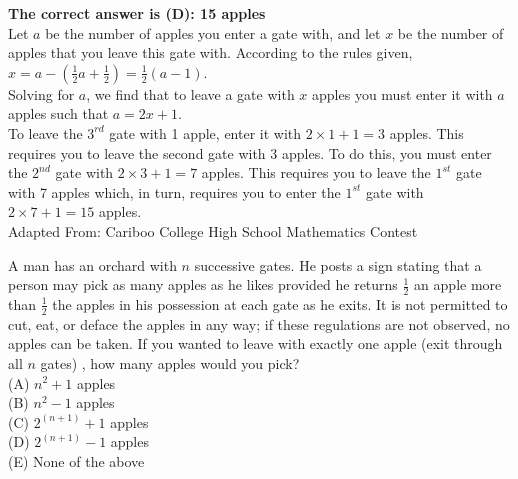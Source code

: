 \documentclass{article}
\begin{document}
\textbf{The correct answer is (D): 15 apples}\\[1 ex]
Let $a$ be the number of apples you enter a gate with, and let $x$ be the number of apples that you leave this gate with. According to the rules given, $x=a-(\frac{1}{2}a+\frac{1}{2})=\frac{1}{2}(a-1)$.
\\[2 ex]
Solving for $a$, we find that to leave a gate with $x$ apples you must enter it with $a$ apples such that $a=2x+1$.
\\[2 ex]
To leave the $3^{rd}$ gate with 1 apple, enter it with $2\times1+1=3$ apples.  This requires you to leave the second gate with 3 apples.  To do this, you must enter the $2^{nd}$ gate with $2\times3+1=7$ apples.  This requires you to leave the $1^{st}$ gate with 7 apples which, in turn, requires you to enter the $1^{st}$ gate with $2\times7+1=15$ apples.
\\[5 ex]

\scriptsize
Adapted From: Cariboo College High School Mathematics Contest

\normalsize
A man has an orchard with $n$ successive gates.  He posts a sign stating that a person may pick as many apples as he likes provided he returns $\frac{1}{2}$ an apple more than $\frac{1}{2}$ the apples in his possession at each gate as he exits.  It is not permitted to cut, eat, or deface the apples in any way; if these regulations are not observed, no apples can be taken.  If you wanted to leave with exactly one apple (exit through all $n$ gates) , how many apples would you pick?\\
(A) $n^{2}+1$ apples\\
(B) $n^{2}-1$ apples\\
(C) $2^{(n+1)}+1$ apples\\
(D) $2^{(n+1)}-1$ apples\\
(E) None of the above\\

\end{document}
